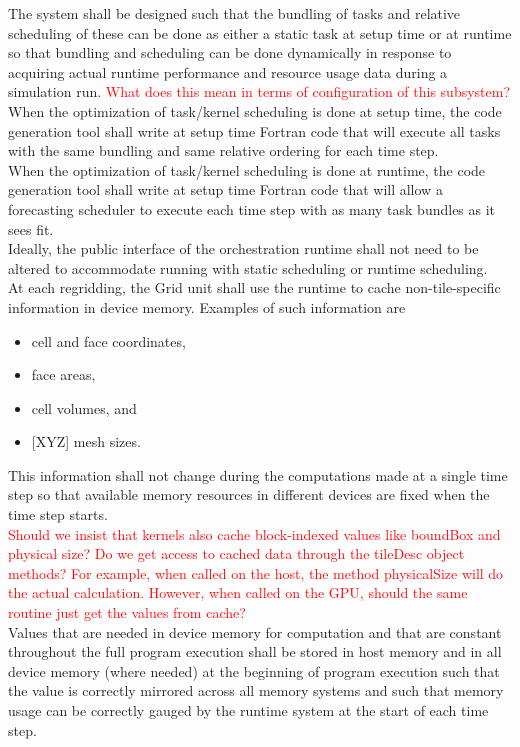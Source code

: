 \documentclass{article}
\begin{document}
The system shall be designed such that the bundling of tasks and relative
scheduling of these can be done as either a static task at setup time or at
runtime so that bundling and scheduling can be done dynamically in response to
acquiring actual runtime performance and resource usage data during a simulation
run.  \textcolor{red}{What does this mean in terms of configuration of this
subsystem?}\\

When the optimization of task/kernel scheduling is done at setup time, the 
code generation tool shall write at setup time Fortran code that will execute
all tasks with the same bundling and same relative ordering for each time
step.\\

When the optimization of task/kernel scheduling is done at runtime, the 
code generation tool shall write at setup time Fortran code that will allow a
forecasting scheduler to execute each time step with as many task bundles as it
sees fit.\\

Ideally, the public interface of the orchestration runtime shall not need to be
altered to accommodate running with static scheduling or runtime scheduling.\\

At each regridding, the Grid unit shall use the runtime to cache
non-tile-specific information in device memory.  Examples of such information
are
\begin{itemize}
\item{cell and face coordinates,}
\item{face areas, }
\item{cell volumes, and}
\item{[XYZ] mesh sizes.}
\end{itemize}
This information shall not change during the computations made at a single time
step so that available memory resources in different devices are fixed when the
time step starts.\\

\textcolor{red}{Should we insist that kernels also cache block-indexed values
like boundBox and physical size?  Do we get access to cached data through the
tileDesc object methods?  For example, when called on the host, the method
physicalSize will do the actual calculation.  However, when called on the GPU,
should the same routine just get the values from cache?}\\

Values that are needed in device memory for computation and that are constant
throughout the full program execution shall be stored in host memory and in all
device memory (where needed) at the beginning of program execution such that the
value is correctly mirrored across all memory systems and such that memory
usage can be correctly gauged by the runtime system at the start of each time
step.\\
\end{document}
